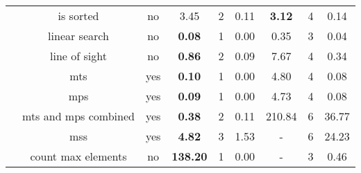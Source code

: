 \begin{table}
{\begin{tabular}[h]{|c|c|c|c|c|c||c|c|c|}
			 & is sorted & no & 3.45 & 2 & 0.11 & {\bfseries 3.12} & 4 & 0.14\\ 
			 & linear search & no & {\bfseries 0.08} & 1 & 0.00 & 0.35 & 3 & 0.04\\ 
			 & line of sight & no & {\bfseries 0.86} & 2 & 0.09 & 7.67 & 4 & 0.34\\ 
			 & mts & yes & {\bfseries 0.10} & 1 & 0.00 & 4.80 & 4 & 0.08\\ 
			 & mps & yes & {\bfseries 0.09} & 1 & 0.00 & 4.73 & 4 & 0.08\\ 
			 & mts and mps combined & yes & {\bfseries 0.38} & 2 & 0.11 & 210.84 & 6 & 36.77\\ 
			 & mss & yes & {\bfseries 4.82} & 3 & 1.53 & - & 6 & 24.23\\ 
			 & count max elements & no & {\bfseries 138.20} & 1 & 0.00 & - & 3 & 0.46\\ 
			\hline
		\end{tabular}
	}
\end{table}
